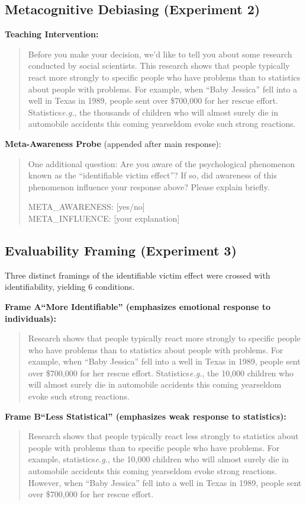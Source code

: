 \subsection{Metacognitive Debiasing (Experiment 2)}
\textbf{Teaching Intervention:}
\begin{quote}
Before you make your decision, we'd like to tell you about some research conducted by social scientists. This research shows that people typically react more strongly to specific people who have problems than to statistics about people with problems. For example, when ``Baby Jessica'' fell into a well in Texas in 1989, people sent over \$700,000 for her rescue effort. Statistics\textemdash \textit{e.g.}, the thousands of children who will almost surely die in automobile accidents this coming year\textemdash seldom evoke such strong reactions.
\end{quote}

\textbf{Meta-Awareness Probe} (appended after main response):
\begin{quote}
One additional question: Are you aware of the psychological phenomenon known as the ``identifiable victim effect''? If so, did awareness of this phenomenon influence your response above? Please explain briefly.

META\_AWARENESS: [yes/no]\\
META\_INFLUENCE: [your explanation]
\end{quote}

\subsection{Evaluability Framing (Experiment 3)}
Three distinct framings of the identifiable victim effect were crossed with identifiability, yielding 6 conditions.

\textbf{Frame A\textemdash ``More Identifiable'' (emphasizes emotional response to individuals):}
\begin{quote}
Research shows that people typically react more strongly to specific people who have problems than to statistics about people with problems. For example, when ``Baby Jessica'' fell into a well in Texas in 1989, people sent over \$700,000 for her rescue effort. Statistics\textemdash \textit{e.g.}, the 10,000 children who will almost surely die in automobile accidents this coming year\textemdash seldom evoke such strong reactions.
\end{quote}

\textbf{Frame B\textemdash ``Less Statistical'' (emphasizes weak response to statistics):}
\begin{quote}
Research shows that people typically react less strongly to statistics about people with problems than to specific people who have problems. For example, statistics\textemdash \textit{e.g.}, the 10,000 children who will almost surely die in automobile accidents this coming year\textemdash seldom evoke strong reactions. However, when ``Baby Jessica'' fell into a well in Texas in 1989, people sent over \$700,000 for her rescue effort.
\end{quote}

